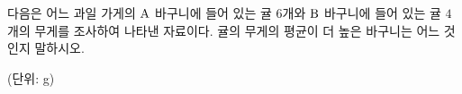 다음은 어느 과일 가게의 $\mathrm{A}$ 바구니에 들어 있는 귤 $6$개와 $\mathrm{B}$ 바구니에 들어 있는 귤 $4$개의 무게를 조사하여 나타낸 자료이다. 귤의 무게의 평균이 더 높은 바구니는 어느 것인지 말하시오.\par{\raggedleft\small (단위: g)\par}
